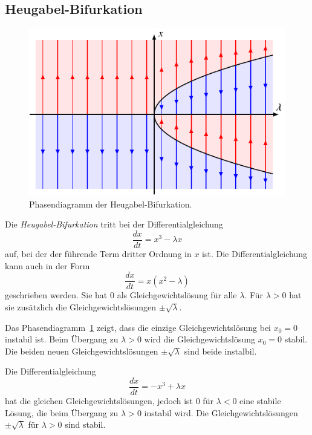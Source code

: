 \subsection{Heugabel-Bifurkation}
%
\begin{figure}
\centering
\includegraphics{chapters/3/pitchfork.pdf}
\caption{Phasendiagramm der Heugabel-Bifurkation.
\label{skript:dgl:pitchfork}}
\end{figure}
Die {\em Heugabel-Bifurkation} tritt bei der Differentialgleichung
\begin{equation}
\frac{dx}{dt} = x^3 - \lambda x
\label{skript:dgl:heugabel-dgl}
\end{equation}
auf, bei der der führende Term
dritter Ordnung in $x$ ist.
Die Differentialgleichung
kann auch in der Form
\[
\frac{dx}{dt}
=
x(x^2-\lambda)
\]
geschrieben werden.
Sie hat $0$ als Gleichgewichtslösung für alle $\lambda$.
Für $\lambda>0$ hat sie zusätzlich die Gleichgewichtslösungen
$\pm\sqrt{\lambda}$.

Das Phasendiagramm~\ref{skript:dgl:pitchfork} zeigt, dass
die einzige Gleichgewichtslösung bei $x_0=0$ instabil ist.
Beim Übergang zu $\lambda>0$ wird die Gleichgewichtslösung $x_0=0$
stabil.
Die beiden neuen Gleichgewichtslösungen $\pm\sqrt{\lambda}$ sind
beide instalbil.

Die Differentialgleichung
\[
\frac{dx}{dt} = -x^3+\lambda x
\]
hat die gleichen Gleichgewichtslösungen, jedoch ist $0$ für
$\lambda<0$ eine stabile Lösung, die beim Übergang zu $\lambda>0$
instabil wird.
Die Gleichgewichtslösungen $\pm\sqrt{\lambda}$ für $\lambda >0$
sind stabil.

